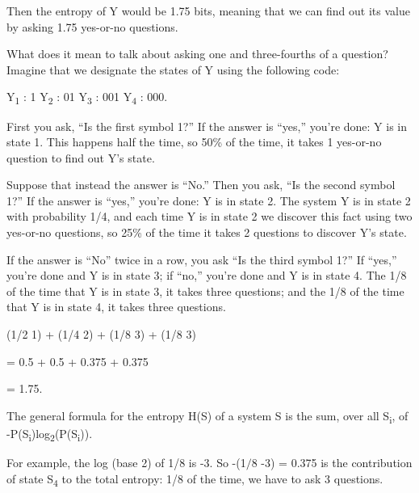 \bigskip

{
 Then the entropy of Y would be 1.75 bits, meaning that we can find
out its value by asking 1.75 yes-or-no questions.}

{
 What does it mean to talk about asking one and three-fourths of a
question? Imagine that we designate the states of Y using the following
code:}

{\centering
 Y\textsubscript{1} : 1\newline
 Y\textsubscript{2} : 01\newline
 Y\textsubscript{3} : 001\newline
 Y\textsubscript{4} : 000.
\par}


\bigskip

{
 First you ask, ``Is the first symbol
1?'' If the answer is
``yes,'' you're
done: Y is in state 1. This happens half the time, so 50\% of the time,
it takes 1 yes-or-no question to find out Y's state.}

{
 Suppose that instead the answer is
``No.'' Then you ask,
``Is the second symbol 1?'' If the
answer is ``yes,''
you're done: Y is in state 2. The system Y is in state
2 with probability 1/4, and each time Y is in state 2 we discover this
fact using two yes-or-no questions, so 25\% of the time it takes 2
questions to discover Y's state.}

{
 If the answer is ``No'' twice
in a row, you ask ``Is the third symbol
1?'' If ``yes,''
you're done and Y is in state 3; if
``no,'' you're done
and Y is in state 4. The 1/8 of the time that Y is in state 3, it takes
three questions; and the 1/8 of the time that Y is in state 4, it takes
three questions.}

{\centering
 (1/2 {\texttimes} 1) + (1/4 {\texttimes} 2) + (1/8 {\texttimes} 3)
+ (1/8 {\texttimes} 3)
\par}


\bigskip

{\centering
 = 0.5 + 0.5 + 0.375 + 0.375
\par}


\bigskip

{\centering
 = 1.75.
\par}


\bigskip

{
 The general formula for the entropy H(S) of a system S is the sum,
over all S\textsubscript{i}, of
-P(S\textsubscript{i})log\textsubscript{2}(P(S\textsubscript{i})).}

{
 For example, the log (base 2) of 1/8 is -3. So -(1$/$8
{\texttimes} -3) = 0.375 is the contribution of state
S\textsubscript{4} to the total entropy: 1/8 of the time, we have to
ask 3 questions.}

